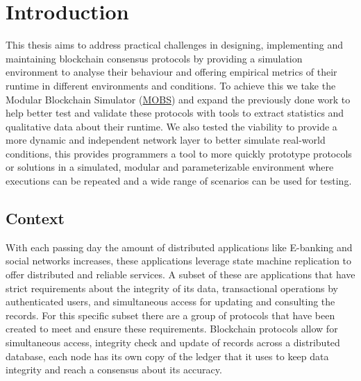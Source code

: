 
%

\chapter{Introduction}\label{cha:introduction}

This thesis aims to address practical challenges in designing, implementing and maintaining blockchain consensus
protocols by providing a simulation environment to analyse their behaviour and offering empirical metrics of their runtime in
different environments and conditions. To achieve this we take the Modular Blockchain Simulator (\href{https://github.com/mce-alves/MOBS
}{MOBS}) and expand the previously done work to help better test and validate these protocols with tools to extract statistics and 
qualitative data about their runtime. We also tested the viability to provide a more dynamic and independent network layer
to better simulate real-world conditions, this provides programmers a tool to more quickly prototype protocols or solutions
in a simulated, modular and parameterizable environment where executions can be repeated and a wide range of scenarios
can be used for testing.


\section{Context}\label{sub:context}
With each passing day the amount of distributed applications like E-banking and social networks increases, these applications
leverage state machine replication to offer distributed and reliable services. A subset of these are applications
that have strict requirements about the integrity of its data, transactional operations by authenticated users, 
and simultaneous access for updating and
consulting the records. For this specific subset there are a group of protocols that have been created to meet and ensure
these requirements. Blockchain protocols allow for simultaneous access, integrity check and update of records across
a distributed database, each node has its own copy of the ledger that it uses to keep data integrity and reach a consensus
about its accuracy.

